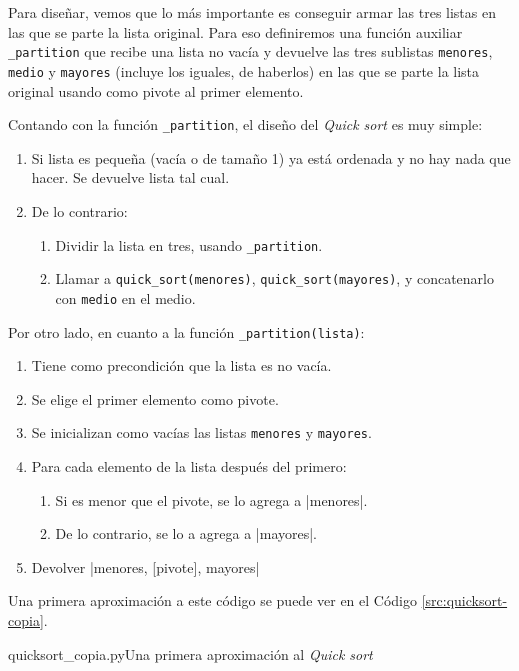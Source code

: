 Para diseñar, vemos que lo más importante es conseguir armar las tres
listas en las que se parte la lista original. Para eso definiremos una
función auxiliar \lstinline!_partition! que recibe una lista no vacía y
devuelve las tres sublistas \lstinline!menores!, \lstinline!medio! y
\lstinline!mayores!  (incluye los iguales, de haberlos) en las que se parte
la lista original usando como pivote al primer elemento.

Contando con la función \lstinline!_partition!, el diseño del {\it Quick sort}
es muy simple:

\begin{enumerate}
\item Si lista es pequeña (vacía o de tamaño 1) ya está ordenada y
no hay nada que hacer. Se devuelve lista tal cual.
\item De lo contrario:
\begin{enumerate}
\item Dividir la lista en tres, usando \lstinline!_partition!.
\item Llamar a \lstinline!quick_sort(menores)!,
\lstinline!quick_sort(mayores)!, y concatenarlo con \lstinline!medio! en el
medio.
\end{enumerate}
\end{enumerate}

Por otro lado, en cuanto a la función \lstinline!_partition(lista)!:

\begin{enumerate}
\item Tiene como precondición que la lista es no vacía.
\item Se elige el primer elemento como pivote.
\item Se inicializan como vacías las listas \lstinline!menores! y
\lstinline!mayores!.
\item Para cada elemento de la lista después del primero:
\begin{enumerate}
\item Si es menor que el pivote, se lo agrega a |menores|.
\item De lo contrario, se lo a agrega a |mayores|.
\end{enumerate}
\item Devolver |menores, [pivote], mayores|
\end{enumerate}

Una primera aproximación a este código se puede ver en el Código
\ref{src:quicksort-copia}.

\begin{codigo}{quicksort\_copia.py}{Una primera aproximación al {\it Quick sort}}
\label{src:quicksort-copia}

\end{codigo}


